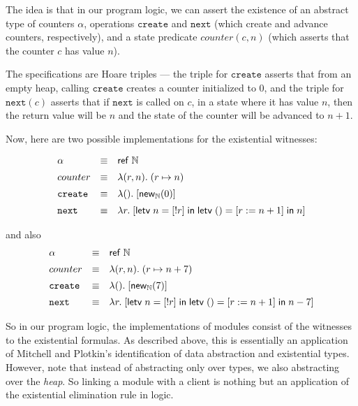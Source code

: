 The idea is that in our program logic, we can assert the existence of
an abstract type of counters $\alpha$, operations $\mathtt{create}$
and $\mathtt{next}$ (which create and advance counters, respectively),
and a state predicate $\mathit{counter}(c, n)$ (which asserts that the
counter $c$ has value $n$).

The specifications are Hoare triples --- the triple for $\mathtt{create}$ asserts
that from an empty heap, calling $\mathtt{create}$ creates a counter initialized
to 0, and the triple for $\mathtt{next}(c)$ asserts that if $\mathtt{next}$ is called
on $c$, in a state where it has value $n$, then the return value will be $n$ and
the state of the counter will be advanced to $n+1$. 

Now, here are two possible implementations for the existential witnesses:

\begin{displaymath}
\begin{array}{lcl}
\alpha & \equiv & \mathsf{ref}\;\mathbb{N} \\[0.5em]
counter & \equiv & \lambda (r, n).\; (r \mapsto n) \\[0.5em]
\mathtt{create} & \equiv & \lambda ().\; [\mathsf{new}_{\mathbb{N}}(0)] \\[0.5em]
\mathtt{next}  & \equiv & \lambda r.\; [\mathsf{letv}\;n = [!r]\;\mathsf{in}\;
                                        \mathsf{letv}\;() = [r := n + 1]\;\mathsf{in}\;n] \\
\end{array}
\end{displaymath}

and also                                        
\begin{displaymath}
\begin{array}{lcl}
\alpha & \equiv & \mathsf{ref}\;\mathbb{N} \\[0.5em]
counter & \equiv & \lambda (r, n).\; (r \mapsto n + 7) \\[0.5em]
\mathtt{create} & \equiv & \lambda ().\; [\mathsf{new}_{\mathbb{N}}(7)] \\[0.5em]
\mathtt{next}  & \equiv & \lambda r.\; [\mathsf{letv}\;n = [!r]\;\mathsf{in}\;
                                        \mathsf{letv}\;() = [r := n + 1]\;\mathsf{in}\;n - 7] \\
\end{array}
\end{displaymath}

So in our program logic, the implementations of modules consist of the
witnesses to the existential formulas. As described above, this is
essentially an application of Mitchell and Plotkin's identification of
data abstraction and existential types. However, note that instead of
abstracting only over types, we also abstracting over the
\emph{heap}. So linking a module with a client is nothing but an
application of the existential elimination rule in logic.


